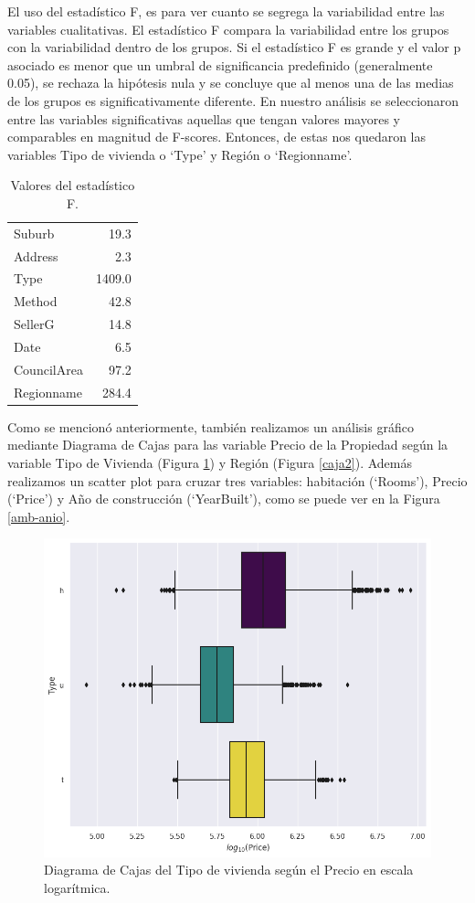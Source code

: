 El uso del estadístico F, es para ver cuanto se segrega la variabilidad entre las variables cualitativas. El estadístico F compara la variabilidad entre los grupos con la variabilidad dentro de los grupos. Si el estadístico F es grande y el valor p asociado es menor que un umbral de significancia predefinido (generalmente 0.05), se rechaza la hipótesis nula y se concluye que al menos una de las medias de los grupos es significativamente diferente. En nuestro análisis se seleccionaron entre las variables significativas aquellas que tengan valores mayores y comparables en magnitud de F-scores. Entonces, de estas nos quedaron las variables Tipo de vivienda o  `Type' y Región  o `Regionname'.

\begin{table}[!ht]
\small
\centering
\caption{Valores del estadístico F.}
\label{t.f}
\begin{tabular}{l|r}
\hline\hline
Suburb & 19.3 \\
Address & 2.3 \\
Type & 1409.0 \\
Method & 42.8 \\
SellerG & 14.8 \\
Date & 6.5 \\
CouncilArea & 97.2 \\
Regionname & 284.4 \\
\hline\hline
\end{tabular}
\end{table}

Como se mencionó anteriormente, también realizamos un análisis gráfico mediante Diagrama de Cajas para las variable Precio de la Propiedad según la variable Tipo de Vivienda (Figura \ref{caja1}) y  Región (Figura \ref{caja2}). Además realizamos un scatter plot para cruzar tres variables: habitación (`Rooms'), Precio (`Price') y Año de construcción (`YearBuilt'), como se puede ver en la Figura \ref{amb-anio}. 


\begin{figure} [!ht]
\begin{center}
\includegraphics[width=0.8\columnwidth]{img/box1.png}
\caption{Diagrama de Cajas del Tipo de vivienda según el Precio en escala logarítmica.}
\label{caja1}
\end{center}
\end{figure}

